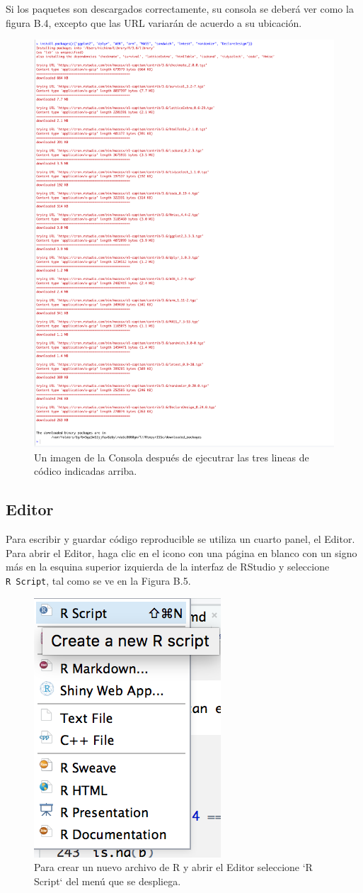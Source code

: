 \documentclass[
  12pt,
  spanish,
]{book}
\begin{document}
Si los paquetes son descargados correctamente, su consola se deberá ver como la figura B.4, excepto que las URL variarán de acuerdo a su ubicación.

\begin{figure}
\includegraphics[width=0.4\linewidth]{Images/console2a} \caption{Un imagen de la Consola después de ejecutrar las tres lineas de códico indicadas arriba.}\label{fig:console2}
\end{figure}

\hypertarget{editor}{%
\subsection{Editor}\label{editor}}

Para escribir y guardar código reproducible se utiliza un cuarto panel, el Editor. Para abrir el Editor, haga clic en el icono con una página en blanco con un signo más en la esquina superior izquierda de la interfaz de RStudio y seleccione \texttt{R\ Script}, tal como se ve en la Figura B.5.

\begin{figure}
\includegraphics[width=0.6\linewidth]{Images/new_script} \caption{Para crear un nuevo archivo de R y abrir el Editor seleccione `R Script` del menú que se despliega.}\label{fig:newscript}
\end{figure}
\end{document}
